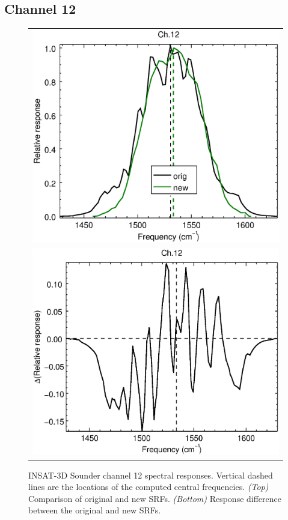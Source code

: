 \subsection{Channel 12}
\begin{figure}[H]
  \centering
  \begin{tabular}{c}
    \includegraphics[scale=0.55]{graphics/sndr/srf/sndr_insat3d-12.eps} \\
    \includegraphics[scale=0.55]{graphics/sndr/srf/sndr_insat3d-12.difference.eps}
  \end{tabular}
  \caption{INSAT-3D Sounder channel 12 spectral responses. Vertical dashed lines are the locations of the computed central frequencies. \emph{(Top)} Comparison of original and new SRFs. \emph{(Bottom)} Response difference between the original and new SRFs.}
  \label{fig:sndr_ch12}
\end{figure}

